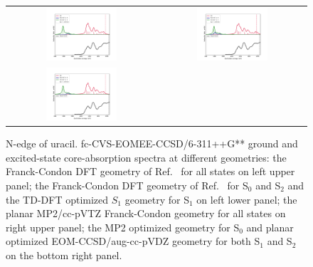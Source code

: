 \documentclass[journal=jctcce,manuscript=article]{achemso}
\begin{document}
\begin{figure}[H]
\caption{N-edge of uracil. fc-CVS-EOMEE-CCSD/6-311++G** ground and excited-state core-absorption spectra at different geometries: 
the Franck-Condon DFT geometry of Ref.~ for all states
on left upper panel; the Franck-Condon DFT geometry of Ref.~  for S$_0$ and S$_2$ and the TD-DFT 
optimized $S_1$ geometry for S$_1$ on left lower panel;  
the planar MP2/cc-pVTZ Franck-Condon geometry for all states
on right upper panel; the MP2 optimized geometry for S$_0$ and
planar optimized EOM-CCSD/aug-cc-pVDZ geometry for both S$_1$ and S$_2$ 
on the bottom right panel.
\label{fgr:uracil:trnexafs_uracil_n}}
\begin{tabular}{cc}
\hspace{-3mm}
\includegraphics[width=0.5\textwidth]{Spectra/S1opt_Uracil_Sn_N_zoom.pdf} 
& 
\includegraphics[width=0.5\textwidth]{Spectra/FC_Uracil_Sn_N_zoom.pdf}
\\
\hspace{-3mm}
\includegraphics[width=0.5\textwidth]{Spectra/S1opt_Uracil_Sn_N_zoom.pdf} 

\end{tabular}
\end{figure}
\end{document}

